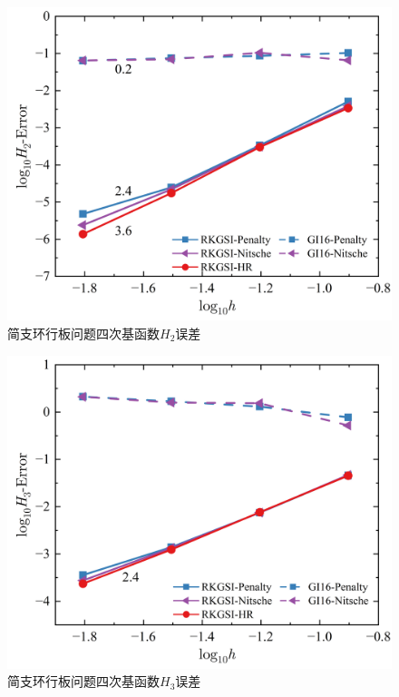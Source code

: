 \begin{figure}[H]
    \centering
    \includegraphics[scale=0.5]{figure/PHR/A/QH2.png}
    \caption{简支环行板问题四次基函数$H_2$误差}
\end{figure}
\newpage
\begin{figure}[H]
    \centering
    \includegraphics[scale=0.5]{figure/PHR/A/QH3.png}
    \caption{简支环行板问题四次基函数$H_3$误差}\label{AQLH2}
\end{figure}
